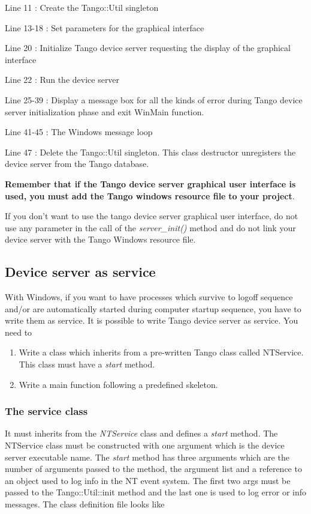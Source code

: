 Line 11 : Create the Tango::Util singleton

Line 13-18 : Set parameters for the graphical interface

Line 20 : Initialize Tango device server requesting the display of
the graphical interface

Line 22 : Run the device server

Line 25-39 : Display a message box for all the kinds of error during
Tango device server initialization phase and exit WinMain
function.

Line 41-45 : The Windows message loop

Line 47 : Delete the Tango::Util singleton. This class destructor
unregisters the device server from the Tango database.

\textbf{Remember that if the Tango device server graphical user interface
is used, you must add the Tango windows resource
file} \textbf{to your project}.

If you don't want to use the tango device server graphical user interface,
do not use any parameter in the call of the \emph{server\_init()}
method and do not link your device server with the Tango Windows resource
file.


\subsection{Device server as service}

With Windows, if you want to have processes which survive to logoff
sequence and/or are automatically started during computer startup
sequence, you have to write them as service. It is
possible to write Tango device server as service. You need to
\begin{enumerate}
\item Write a class which inherits from a pre-written Tango class called
NTService. This class must have a \emph{start} method. 
\item Write a main function following a predefined skeleton.
\end{enumerate}

\subsubsection{The service class}

It must inherits from the \emph{NTService} class and defines a \emph{start}
method. The NTService class must be constructed
with one argument which is the device server executable
name. The \emph{start} method has three arguments which are the number
of arguments passed to the method, the argument list and a reference
to an object used to log info in the NT event system. The first two
args must be passed to the Tango::Util::init method and the last one
is used to log error or info messages. The class definition file looks
like


